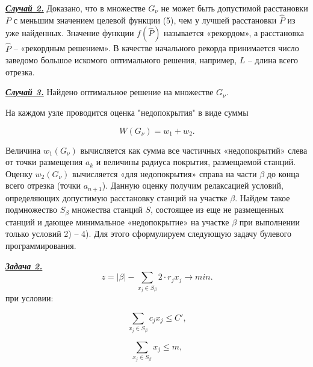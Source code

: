\underline{\textit{\textbf{Случай 2.}}} Доказано, что в множестве $G_\nu$ не может быть допустимой расстановки $P$ с меньшим значением целевой функции (5), чем у лучшей расстановки $\widehat{P}$ из уже найденных. Значение функции $f(\widehat{P})$ называется «рекордом», а расстановка $\widehat{P}$ -- «рекордным решением». В качестве начального рекорда принимается число заведомо большое искомого оптимального решения, например, $L$ – длина всего отрезка.

\underline{\textit{\textbf{Случай 3.}}} Найдено оптимальное решение на множестве $G_\nu$.

На каждом узле проводится оценка "недопокрытия"  в виде суммы

\begin{displaymath}
    W\left(G_\nu\right) = w_1 + w_2. 
\end{displaymath}

Величина $w_1 \left(G_\nu \right)$ вычисляется как сумма все частичных «недопокрытий» слева от точки размещения $a_k$ и величины радиуса покрытия, размещаемой станций. Оценку $w_2 \left(G_\nu \right)$ вычисляется «для недопокрытия» справа на части $\beta$ до конца всего отрезка (точки $a_{n+1}$). Данную оценку получим релаксацией условий, определяющих допустимую расстановку станций на участке $\beta$. Найдем такое подмножество $S_\beta$ множества станций $S$, состоящее из еще не размещенных станций и дающее минимальное «недопокрытие» на участке $\beta$ при выполнении только условий 2) – 4). Для этого сформулируем следующую задачу булевого программирования.

\underline{\textit{\textbf{Задача 2.}}}
\begin{displaymath}
    z = |\beta| - \sum\limits_{x_j \in S_\beta} 2 \cdot r_j x_j \rightarrow min.
\end{displaymath}
при условии:

\begin{equation}\label{eq:part4_task2_cost}
    \sum\limits_{x_j \in S_\beta} c_j x_j \leqslant C',
\end{equation}

\begin{equation}\label{eq:part4_task2_m}
    \sum\limits_{x_j \in S_\beta} x_j \leqslant m,
\end{equation}

